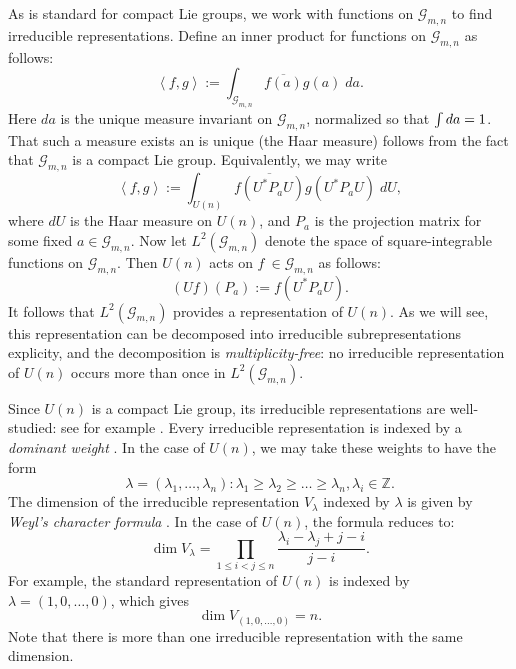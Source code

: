 \documentclass[12pt]{article}
\numberwithin{equation}{section}
\theoremstyle{plainsl}
\newcommand\defn[1]{\textsl{#1}}
\newcommand\la{\lambda}
\newcommand\ints{{\mathbb Z}}
\newcommand\gras[2]{\mathcal{G}_{#1,#2}}
\newcommand\ip[2]{\left\langle#1,#2\right\rangle}
\newcommand\conj[1]{\overline{#1}}
\begin{document}
As is standard for compact Lie groups, we work with functions on $\gras{m}{n}$ to find irreducible representations. Define an inner product for functions on $\gras{m}{n}$ as follows:
\[
\ip{f}{g} := \int_{\gras{m}{n}} \conj{f(a)}g(a) \; da.
\]
Here $da$ is the unique measure invariant on $\gras{m}{n}$, normalized so that $\nobreak{\int da = 1}$. That such a measure exists an is unique (the Haar measure) follows from the fact that $\gras{m}{n}$ is a compact Lie group. Equivalently, we may write
\[
\ip{f}{g} := \int_{U(n)} \conj{f(U^*P_aU)}g(U^*P_aU) \;dU,
\]
where $dU$ is the Haar measure on $U(n)$, and $P_a$ is the projection matrix for some fixed $a \in \gras{m}{n}$. Now let $L^2(\gras{m}{n})$ denote the space of square-integrable functions on $\gras{m}{n}$. Then $U(n)$ acts on $f\ \in \gras{m}{n}$ as follows:
\[
(Uf)(P_a) := f(U^*P_aU).
\]
It follows that $L^2(\gras{m}{n})$ provides a representation of $U(n)$. As we will see, this representation can be decomposed into irreducible subrepresentations explicity, and the decomposition is \defn{multiplicity-free}: no irreducible representation of $U(n)$ occurs more than once in $L^2(\gras{m}{n})$. 

Since $U(n)$ is a compact Lie group, its irreducible representations are well-studied: see for example \cite{sep,gw1,bump,fh1}. Every irreducible representation is indexed by a \defn{dominant weight} \cite[Theorem 7.34]{sep}. In the case of $U(n)$, we may take these weights to have the form \cite[Theorem 38.3]{bump}
\[
\la = (\la_1,\ldots,\la_n): \la_1 \geq \la_2 \geq \ldots \geq \la_n, \la_i \in \ints.
\]
The dimension of the irreducible representation $V_\la$ indexed by $\la$ is given by \defn{Weyl's character formula} \cite[Theorem 7.32]{sep}. In the case of $U(n)$, the formula reduces to: 
\begin{equation}
\dim V_\la = \prod_{1 \leq i < j \leq n} \frac{\la_i - \la_j + j-i}{j-i}.
\label{eqn:weylchar}
\end{equation}
For example, the standard representation of $U(n)$ is indexed by $\la = (1,0,\ldots,0)$, which gives
\[
\dim V_{(1,0,\ldots,0)} = n.
\]
Note that there is more than one irreducible representation with the same dimension.
\end{document}
